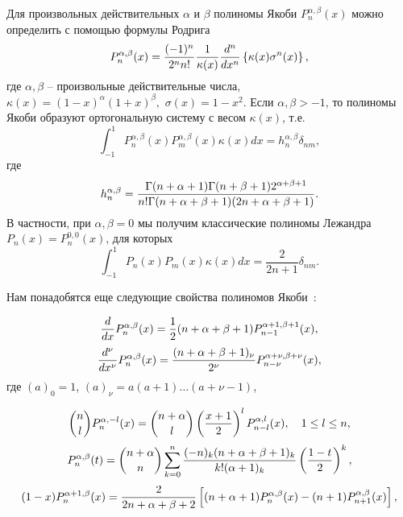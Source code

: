  Для произвольных действительных $\alpha$ и $\beta$ полиномы Якоби  $P_n^{\alpha,\beta}(x)$ можно определить \cite{Sege}  с помощью формулы Родрига
 \begin{equation}\label{2.1}
P_n^{\alpha,\beta}(x) = {(-1)^n\over2^nn!}{1\over\kappa(x)}{d^n\over
dx^n} \left\{\kappa(x)\sigma^n(x)\right\},
\end{equation}
где $\alpha,\beta$ -- произвольные действительные числа, $\kappa(x)=
(1-x)^\alpha(1+x)^\beta,\,\,\sigma(x)=1-x^2$. Если
$\alpha,\beta>-1$, то полиномы Якоби образуют ортогональную
систему с весом $\kappa(x)$, т.е.
\begin{equation}\label{2.2}
\int_{-1}^1P_n^{\alpha,\beta}(x)P_m^{\alpha,\beta}(x)\kappa(x)dx =
h_n^{\alpha,\beta}\delta_{nm},
\end{equation}
где
\begin{equation}\label{2.3}
h_n^{\alpha,\beta} =
{\Gamma(n+\alpha+1)\Gamma(n+\beta+1)2^{\alpha+\beta+1} \over
n!\Gamma(n+\alpha+\beta+1)(2n+\alpha+\beta+1)}.
\end{equation}
В частности, при $\alpha,\beta=0$ мы получим классические полиномы Лежандра $P_n(x)=P_n^{0,0}(x)$, для которых
\begin{equation*}
\int_{-1}^1P_n(x)P_m(x)\kappa(x)dx = \frac{2}{2n+1}\delta_{nm}.
\end{equation*}



Нам понадобятся еще следующие свойства полиномов Якоби~\cite{Sege}:


\begin{equation}\label{2.4}
{d\over dx}P_n^{\alpha,\beta}(x) =
{1\over2}(n+\alpha+\beta+1)P_{n-1}^{\alpha+1,\beta+1}(x),
\end{equation}
\begin{equation}\label{2.5}
{d^\nu\over dx^\nu}P_n^{\alpha,\beta}(x) =
{(n+\alpha+\beta+1)_\nu\over2^\nu} P_{n-\nu}^{\alpha+\nu,\beta+\nu}(x),
\end{equation}
где $(a)_0=1$, $(a)_\nu=a(a+1)\dots(a+\nu-1)$,

 \begin{equation}\label{2.6}
 {n\choose l}P_n^{\alpha,-l}(x)= {n+\alpha\choose
l}\left({x+1\over2}\right)^lP_{n-l}^{\alpha,l}(x),
     \quad 1\le l \le n,
\end{equation}
\begin{equation}\label{2.7}
P_n^{\alpha,\beta}(t) ={n+\alpha\choose n}
\sum_{k=0}^n{(-n)_k(n+\alpha+\beta+1)_k\over k!(\alpha+1)_k}
\left({1-t\over 2}\right)^k,
\end{equation}
\begin{equation}\label{2.8}
(1-x)P_n^{\alpha+1,\beta}(x)={2\over2n+\alpha+\beta+2}
\left[(n+ \alpha+1)P_n^{\alpha,\beta}(x)-
(n+1)P_{n+1}^{\alpha,\beta}(x)\right],
\end{equation}

